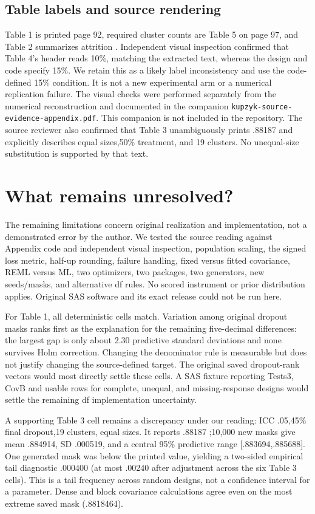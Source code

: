 \documentclass[11pt]{article}
\begin{document}
\subsection{Table labels and source rendering}
Table 1 is printed page 92, required cluster counts are Table 5 on page 97, and Table 2 summarizes attrition \citep[pp.~92--97]{kupzyk2011}. Independent visual inspection confirmed that Table 4's header reads 10\%, matching the extracted text, whereas the design and code specify 15\%. We retain this as a likely label inconsistency and use the code-defined 15\% condition. It is not a new experimental arm or a numerical replication failure. The visual checks were performed separately from the numerical reconstruction and documented in the companion \nolinkurl{kupzyk-source-evidence-appendix.pdf}. This companion is not included in the repository. The source reviewer also confirmed that Table 3 unambiguously prints .88187 and explicitly describes equal sizes,50\% treatment, and 19 clusters. No unequal-size substitution is supported by that text.
\section{What remains unresolved?}
The remaining limitations concern original realization and implementation, not a demonstrated error by the author. We tested the source reading against Appendix code and independent visual inspection, population scaling, the signed loss metric, half-up rounding, failure handling, fixed versus fitted covariance, REML versus ML, two optimizers, two packages, two generators, new seeds/masks, and alternative df rules. No scored instrument or prior distribution applies. Original SAS software and its exact release could not be run here.

For Table 1, all deterministic cells match. Variation among original dropout masks ranks first as the explanation for the remaining five-decimal differences: the largest gap is only about 2.30 predictive standard deviations and none survives Holm correction. Changing the denominator rule is measurable but does not justify changing the source-defined target. The original saved dropout-rank vectors would most directly settle these cells. A SAS fixture reporting Tests3, CovB and usable rows for complete, unequal, and missing-response designs would settle the remaining df implementation uncertainty.

A supporting Table 3 cell remains a discrepancy under our reading: ICC .05,45\% final dropout,19 clusters, equal sizes. It reports .88187 \citep[Table~3, p.~94]{kupzyk2011};10,000 new masks give mean .884914, SD .000519, and a central 95\% predictive range [.883694,.885688]. One generated mask was below the printed value, yielding a two-sided empirical tail diagnostic .000400 (at most .00240 after adjustment across the six Table 3 cells). This is a tail frequency across random designs, not a confidence interval for a parameter. Dense and block covariance calculations agree even on the most extreme saved mask (.8818464).
\end{document}
